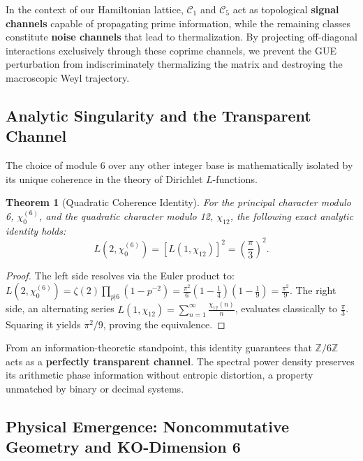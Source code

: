 \documentclass[prl,aps,floatfix,superscriptaddress,10pt]{revtex4-2}
\newtheorem{theorem}{Theorem}[section]
\newcommand{\Zmod}{\mathbb{Z}/6\mathbb{Z}}
\begin{document}
In the context of our Hamiltonian lattice, $\mathcal{C}_1$ and $\mathcal{C}_5$ act as topological \textbf{signal channels} capable of propagating prime information, while the remaining classes constitute \textbf{noise channels} that lead to thermalization. By projecting off-diagonal interactions exclusively through these coprime channels, we prevent the GUE perturbation from indiscriminately thermalizing the matrix and destroying the macroscopic Weyl trajectory.

\subsection{Analytic Singularity and the Transparent Channel}

The choice of module 6 over any other integer base is mathematically isolated by its unique coherence in the theory of Dirichlet $L$-functions.

\begin{theorem}[Quadratic Coherence Identity]
\label{thm:quadratic}
For the principal character modulo 6, $\chi_0^{(6)}$, and the quadratic character modulo 12, $\chi_{12}$, the following exact analytic identity holds:
\begin{equation}
L(2, \chi_0^{(6)}) = \left[ L(1, \chi_{12}) \right]^2 = \left( \frac{\pi}{3} \right)^2.
\end{equation}
\end{theorem}

\begin{proof}
The left side resolves via the Euler product to:
$L(2, \chi_0^{(6)}) = \zeta(2) \prod_{p|6} (1-p^{-2}) = \frac{\pi^2}{6} \left(1-\frac{1}{4}\right)\left(1-\frac{1}{9}\right) = \frac{\pi^2}{9}$.
The right side, an alternating series $L(1, \chi_{12}) = \sum_{n=1}^\infty \frac{\chi_{12}(n)}{n}$, evaluates classically to $\frac{\pi}{3}$. Squaring it yields $\pi^2/9$, proving the equivalence.
\end{proof}

From an information-theoretic standpoint, this identity guarantees that $\Zmod$ acts as a \textbf{perfectly transparent channel}. The spectral power density preserves its arithmetic phase information without entropic distortion, a property unmatched by binary or decimal systems.

\subsection{Physical Emergence: Noncommutative Geometry and KO-Dimension 6}
\end{document}
